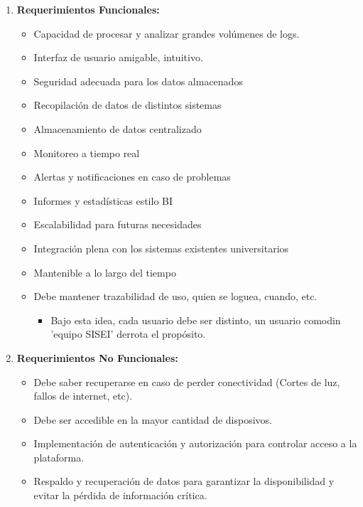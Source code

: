 \begin{enumerate}
  \item \textbf{Requerimientos Funcionales:} 
    \begin{itemize}
      \item Capacidad de procesar y analizar grandes volúmenes de logs.
      \item Interfaz de usuario amigable, intuitivo.
      \item Seguridad adecuada para los datos almacenados
      \item Recopilación de datos de distintos sistemas
      \item Almacenamiento de datos centralizado
      \item Monitoreo a tiempo real
      \item Alertas y notificaciones en caso de problemas
      \item Informes y estadísticas estilo BI
      \item Escalabilidad para futuras necesidades
      \item Integración plena con los sistemas existentes universitarios
      \item Mantenible a lo largo del tiempo
      \item Debe mantener trazabilidad de uso, quien se loguea, cuando, etc.
        \begin{itemize}
          \item Bajo esta idea, cada usuario debe ser distinto, un usuario comodin 'equipo SISEI' derrota el propósito.
        \end{itemize}
    \end{itemize}
  \item \textbf{Requerimientos No Funcionales:} 
    \begin{itemize}
      \item Debe saber recuperarse en caso de perder conectividad (Cortes de luz, fallos de internet, etc).
      \item Debe ser accedible en la mayor cantidad de disposivos.
      \item Implementación de autenticación y autorización para controlar acceso a la plataforma.
      \item Respaldo y recuperación de datos para garantizar la disponibilidad y evitar la pérdida de información crítica.
    \end{itemize}
\end{enumerate}


\clearpage
